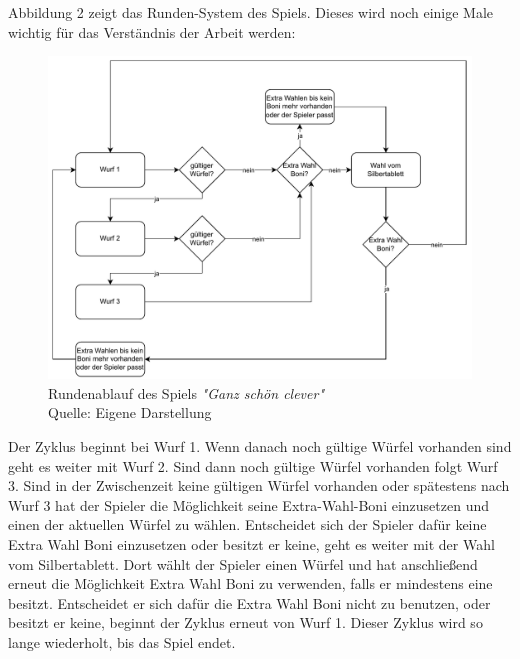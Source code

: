 	Abbildung 2 zeigt das Runden-System des Spiels. Dieses wird noch einige Male wichtig für das Verständnis der Arbeit werden:
	\nopagebreak
\begin{figure}[H]
	\includegraphics[width=1\textwidth]{Bilder/Rundenablauf.drawio} 
	\caption[Rundenablauf des Spiels \textit{"Ganz schön clever"}]{Rundenablauf des Spiels \textit{"Ganz schön clever"}\\ Quelle: Eigene Darstellung}
\end{figure}

Der Zyklus beginnt bei Wurf 1. Wenn danach noch gültige Würfel vorhanden sind geht es weiter mit Wurf 2. Sind dann noch gültige Würfel vorhanden folgt Wurf 3. Sind in der Zwischenzeit keine gültigen Würfel vorhanden oder spätestens nach Wurf 3 hat der Spieler die Möglichkeit seine Extra-Wahl-Boni einzusetzen und einen der aktuellen Würfel zu wählen. Entscheidet sich der Spieler dafür keine Extra Wahl Boni einzusetzen oder besitzt er keine, geht es weiter mit der Wahl vom Silbertablett. Dort wählt der Spieler einen Würfel und hat anschließend erneut die Möglichkeit Extra Wahl Boni zu verwenden, falls er mindestens eine besitzt. Entscheidet er sich dafür die Extra Wahl Boni nicht zu benutzen, oder besitzt er keine, beginnt der Zyklus erneut von Wurf 1. Dieser Zyklus wird so lange wiederholt, bis das Spiel endet.\\

